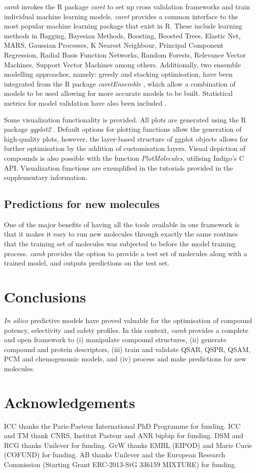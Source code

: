 \documentclass{bioinfo}
\begin{document}
{\it camb} invokes the R package {\it caret} to set up cross validation frameworks and
train individual machine learning models. {\it caret} provides a common interface to the most popular machine learning package that exist in R.
These include learning methods in Bagging, Bayesian Methods, Boosting, Boosted Trees, Elastic Net, MARS, Gaussian Processes, K Nearest Neighbour,
 Principal Component Regression, Radial Basis Function Networks, Random Forests, Relevance Vector Machines, Support Vector Machines among others.
Additionally, two ensemble modelling approaches, namely: greedy and stacking optimisation,
have been integrated from the R package {\it caretEnsemble} \citep{caretEnsemble}, which allow a combination of models to be used 
allowing for more accurate models to be built.
Statistical metrics for model validation have also been included \citep{beware}.

Some visualization functionality is provided. All plots are generated using the R package {\it ggplot2} \citep{ggplot2}.
Default options for plotting functions allow the generation of high-quality plots,
however, the layer-based structure of ggplot objects allows for further optimisation
by the addition of customisation layers.  
Visual depiction of compounds is also possible with the function {\it PlotMolecules},
utilising Indigo's C API. Visualization functions are exemplified in the tutorials provided in the supplementary information.

\subsection{Predictions for new molecules}
One of the major benefits of having all the tools available in one framework is that it makes it easy to run new molecules through exactly the same routines that the training set of molecules was subjected to before the model training process. {\it camb} provides the option to provide a test set of molecules along with a trained model, and outputs predictions on the test set.

\section{Conclusions}
{\it In silico} predictive models have proved valuable
for the optimisation of compound potency, selectivity and safety profiles.
In this context, {\it camb} provides a complete and open framework
to (i) manipulate compound structures, (ii) generate compound and protein descriptors,
(iii) train and validate 
QSAR, QSPR, QSAM, PCM and chemogenomic models, and
(iv) process and make predictions for new molecules.

\section{Acknowledgements}
ICC thanks the Paris-Pasteur International PhD Programme for funding.
ICC and TM thank CNRS, Institut Pasteur and ANR bipbip for funding.
DSM and RCG thanks Unilever for funding.
GvW thanks EMBL (EIPOD) and Marie Curie (COFUND) for funding.
AB thanks Unilever and the European Research Commission (Starting Grant ERC-2013-StG 336159 MIXTURE) for funding.



\end{document}
